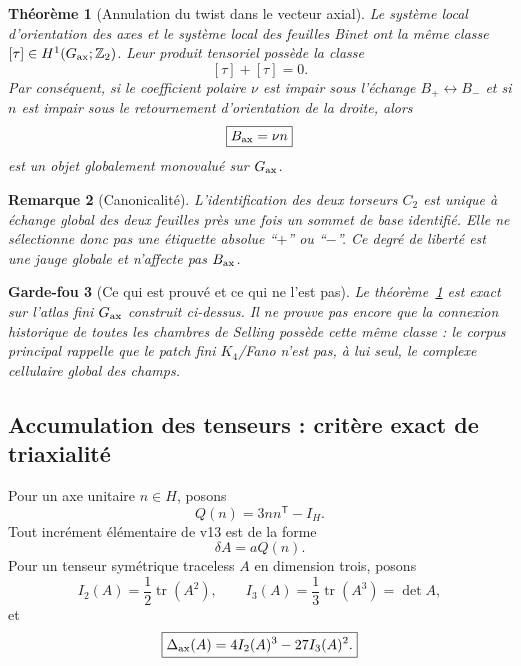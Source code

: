 \documentclass[11pt,a4paper]{article}
\newtheorem{theorem}{Théorème}[section]
\newtheorem{remark}[theorem]{Remarque}
\newtheorem{guardrail}[theorem]{Garde-fou}
\newcommand{\Z}{\mathbb Z}
\begin{document}
\begin{theorem}[Annulation du twist dans le vecteur axial]\label{thm:v14-double-twist}
Le système local d'orientation des axes et le système local des feuilles Binet ont la même classe $[\tau]\in H^1(G_{\rm ax};\Z_2)$. Leur produit tensoriel possède la classe
\[
 [\tau]+[\tau]=0.
\]
Par conséquent, si le coefficient polaire $\nu$ est impair sous l'échange $B_+\leftrightarrow B_-$ et si $n$ est impair sous le retournement d'orientation de la droite, alors
\begin{equation}\label{eq:v14-global-Bax}
 \boxed{
 B_{\rm ax}=\nu n}
\end{equation}
est un objet globalement monovalué sur $G_{\rm ax}$.
\end{theorem}

\begin{remark}[Canonicalité]
L'identification des deux torseurs $C_2$ est unique à échange global des deux feuilles près une fois un sommet de base identifié. Elle ne sélectionne donc pas une étiquette absolue ``$+$'' ou ``$-$''. Ce degré de liberté est une jauge globale et n'affecte pas $B_{\rm ax}$.
\end{remark}

\begin{guardrail}[Ce qui est prouvé et ce qui ne l'est pas]
Le théorème~\ref{thm:v14-double-twist} est exact sur l'atlas fini $G_{\rm ax}$ construit ci-dessus. Il ne prouve pas encore que la connexion historique de toutes les chambres de Selling possède cette même classe : le corpus principal rappelle que le patch fini $K_4$/Fano n'est pas, à lui seul, le complexe cellulaire global des champs.
\end{guardrail}

\subsection{Accumulation des tenseurs : critère exact de triaxialité}

Pour un axe unitaire $n\in H$, posons
\[
 Q(n)=3nn^{\mathsf T}-I_H.
\]
Tout incrément élémentaire de v13 est de la forme
\[
 \delta A=aQ(n).
\]
Pour un tenseur symétrique traceless $A$ en dimension trois, posons
\begin{equation}\label{eq:v14-I23}
 I_2(A)=\frac12\operatorname{tr}(A^2),
 \qquad
 I_3(A)=\frac13\operatorname{tr}(A^3)=\det A,
\end{equation}
et
\begin{equation}\label{eq:v14-axis-disc}
 \boxed{
 \Delta_{\rm ax}(A)
 =
 4I_2(A)^3-27I_3(A)^2.}
\end{equation}
\end{document}
